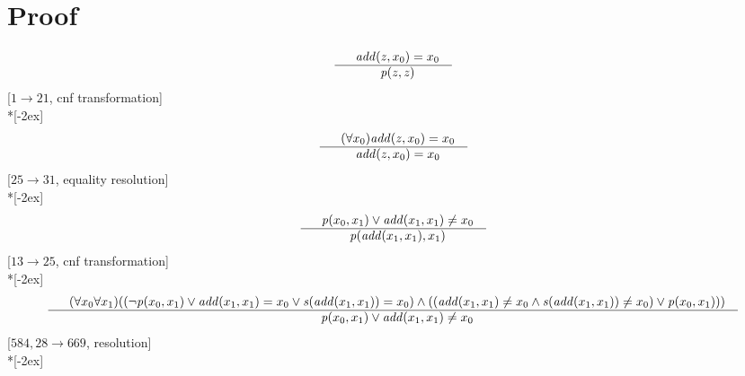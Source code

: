 \documentclass[fleqn]{article}
\newenvironment{VampireProof}{%
   \section{Proof}}{}
\newenvironment{VampireInference}{%
   \begin{array}{c}}{\end{array}}
\newenvironment{VampirePremise}%
   {\begin{array}{l}}%
   {\end{array}}
\newenvironment{VampireConclusion}%
   {\begin{array}{l}}%
   {\end{array}}
\newcommand{\VConclusionSeparator}{\\ \hline}
\newcommand{\Vor}{\vee}
\newcommand{\Vand}{\wedge}
\begin{document}
\begin{VampireProof}
\[\begin{VampireInference}
\begin{VampirePremise}
~~\mathit{add} (\mathit{z},x_{0}) = x_{0}
\end{VampirePremise}
\VConclusionSeparator
\begin{VampireConclusion}
~~\mathit{p} (\mathit{z},\mathit{z})
\end{VampireConclusion}
\end{VampireInference}
\]
[$1\rightarrow 21$, cnf transformation]\\*[-2ex]
\[\begin{VampireInference}
\begin{VampirePremise}%
~~(\forall x_{0} )\mathit{add} (\mathit{z},x_{0}) = x_{0}
\end{VampirePremise}
\VConclusionSeparator
\begin{VampireConclusion}
~~\mathit{add} (\mathit{z},x_{0}) = x_{0}
\end{VampireConclusion}
\end{VampireInference}
\]
[$25\rightarrow 31$, equality resolution]\\*[-2ex]
\[\begin{VampireInference}
\begin{VampirePremise}%
~~\mathit{p} (x_{0},x_{1}) \Vor \mathit{add} (x_{1},x_{1}) \neq x_{0}
\end{VampirePremise}
\VConclusionSeparator
\begin{VampireConclusion}
~~\mathit{p} (\mathit{add} (x_{1},x_{1}),x_{1})
\end{VampireConclusion}
\end{VampireInference}
\]
[$13\rightarrow 25$, cnf transformation]\\*[-2ex]
\[\begin{VampireInference}
\begin{VampirePremise}%
~~(\forall x_{0} \forall x_{1} )((\neg \mathit{p} (x_{0},x_{1}) \Vor \mathit{add} (x_{1},x_{1}) = x_{0} \Vor \mathit{s} (\mathit{add} (x_{1},x_{1})) = x_{0}) \Vand ((\mathit{add} (x_{1},x_{1}) \neq x_{0} \Vand \mathit{s} (\mathit{add} (x_{1},x_{1})) \neq x_{0}) \Vor \mathit{p} (x_{0},x_{1})))
\end{VampirePremise}
\VConclusionSeparator
\begin{VampireConclusion}
~~\mathit{p} (x_{0},x_{1}) \Vor \mathit{add} (x_{1},x_{1}) \neq x_{0}
\end{VampireConclusion}
\end{VampireInference}
\]
[$584,28\rightarrow 669$, resolution]\\*[-2ex]
\[\begin{VampireInference}
\begin{VampirePremise}%

\end{VampirePremise}
\end{VampireInference}\]
\end{VampireProof}
\end{document}
